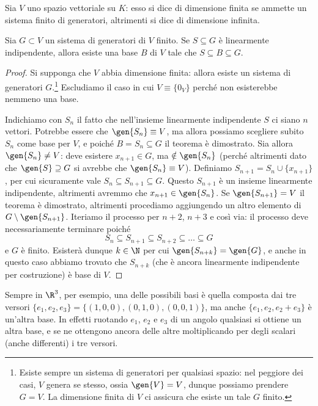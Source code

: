 \begin{definizione}
	Sia $V$ uno spazio vettoriale su $K$: esso si dice di dimensione finita se ammette un sistema finito di generatori, altrimenti si dice di dimensione infinita.
\end{definizione}
\begin{teorema} \label{t:esistenza-base}
	Sia $G\subset V$ un sistema di generatori di $V$ finito.
	Se $S\subseteq G$ è linearmente indipendente, allora esiste una base $B$ di $V$ tale che $S\subseteq B\subseteq G$.
\end{teorema}
\begin{proof}
	Si supponga che $V$ abbia dimensione finita: allora esiste un sistema di generatori $G$.\footnote{Esiste sempre un sistema di generatori per qualsiasi spazio: nel peggiore dei casi, $V$ genera se stesso, ossia $\gen{V}=V$, dunque possiamo prendere $G=V$. La dimensione finita di $V$ ci assicura che esiste un tale $G$ finito.}
	Escludiamo il caso in cui $V\equiv\{0_V\}$ perché non esisterebbe nemmeno una base.

	Indichiamo con $S_n$ il fatto che nell'insieme linearmente indipendente $S$ ci siano $n$ vettori.
	Potrebbe essere che $\gen{S_n}\equiv V$, ma allora possiamo scegliere subito $S_n$ come base per $V$, e poiché $B=S_n\subseteq G$ il teorema è dimostrato.
	Sia allora $\gen{S_n}\ne V$: deve esistere $x_{n+1}\in G$, ma $\notin\gen{S_n}$ (perché altrimenti dato che $\gen{S}\supseteq G$ si avrebbe che $\gen{S_n}\equiv V$).
	Definiamo $S_{n+1}=S_n\cup\{x_{n+1}\}$, per cui sicuramente vale $S_n\subseteq S_{n+1}\subseteq G$.
	Questo $S_{n+1}$ è un insieme linearmente indipendente, altrimenti avremmo che $x_{n+1}\in\gen{S_n}$.
	Se $\gen{S_{n+1}}=V$ il teorema è dimostrato, altrimenti procediamo aggiungendo un altro elemento di $G\setminus\gen{S_{n+1}}$.
	Iteriamo il processo per $n+2$, $n+3$ e così via: il processo deve necessariamente terminare poich\'e
	\begin{equation*}
		S_n\subseteq S_{n+1}\subseteq S_{n+2}\subseteq\dots\subseteq G
	\end{equation*}
	e $G$ è finito.
	Esisterà dunque $k\in\N$ per cui $\gen{S_{n+k}}=\gen{G}$, e anche in questo caso abbiamo trovato che $S_{n+k}$ (che è ancora linearmente indipendente per costruzione) è base di $V$.
\end{proof}
Sempre in $\R^3$, per esempio, una delle possibili basi è quella composta dai tre versori $\{e_1,e_2,e_3\}=\{(1,0,0),(0,1,0),(0,0,1)\}$, ma anche $\{e_1,e_2,e_2+e_3\}$ è un'altra base.
In effetti ruotando $e_1$, $e_2$ e $e_3$ di un angolo qualsiasi si ottiene un altra base, e se ne ottengono ancora delle altre moltiplicando per degli scalari (anche differenti) i tre versori.
